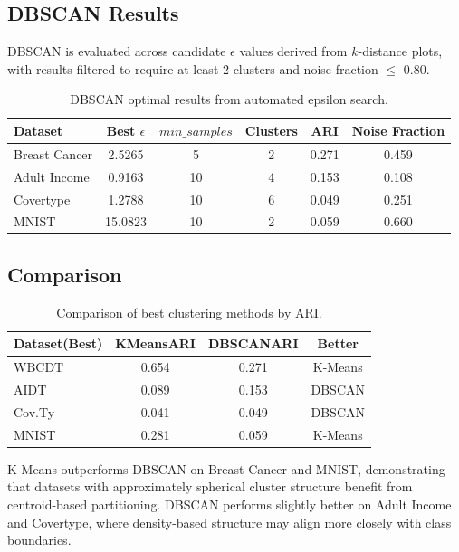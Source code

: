 \documentclass[conference,12pt]{IEEEtran}
\begin{document}
\subsection{DBSCAN Results}

DBSCAN is evaluated across candidate $\epsilon$ values derived from $k$-distance plots, with results filtered to require at least 2 clusters and noise fraction $\leq$ 0.80.

\begin{table}[h]
\centering
\caption{DBSCAN optimal results from automated epsilon search.}
\label{tab:dbscan}
\small
\begin{tabular}{lccccc}
\toprule
Dataset & Best $\epsilon$ & $min\_samples$ & Clusters & ARI & Noise Fraction \\
\midrule
Breast Cancer & 2.5265 & 5 & 2 & 0.271 & 0.459 \\
Adult Income & 0.9163 & 10 & 4 & 0.153 & 0.108 \\
Covertype & 1.2788 & 10 & 6 & 0.049 & 0.251 \\
MNIST & 15.0823 & 10 & 2 & 0.059 & 0.660 \\
\bottomrule
\end{tabular}
\end{table}

\subsection{Comparison}

\begin{table}[h]
\centering
\caption{Comparison of best clustering methods by ARI.}
\label{tab:cluster_compare}
\small
\begin{tabular}{lccc}
\toprule
Dataset(Best) &KMeansARI &DBSCANARI & Better \\
\midrule
WBCDT & 0.654 & 0.271 & K-Means \\
AIDT & 0.089 & 0.153 & DBSCAN \\
Cov.Ty & 0.041 & 0.049 & DBSCAN \\
MNIST & 0.281 & 0.059 & K-Means \\
\bottomrule
\end{tabular}
\end{table}

K-Means outperforms DBSCAN on Breast Cancer and MNIST, demonstrating that datasets with approximately spherical cluster structure benefit from centroid-based partitioning. DBSCAN performs slightly better on Adult Income and Covertype, where density-based structure may align more closely with class boundaries.
\end{document}
